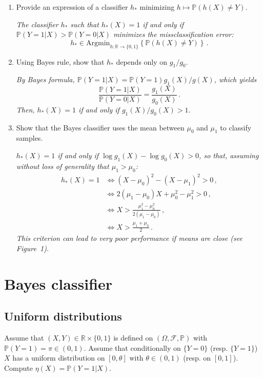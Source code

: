 \documentclass[a4paper,10pt,fleqn]{article}
\newcommand{\eqsp}{\,}
\newcommand{\rset}{\ensuremath{\mathbb{R}}}
\newcommand{\bP}{\mathbb{P}}
\newcommand{\1}{\ensuremath{\mathbbm{1}}}
\begin{document}
\begin{enumerate}
\item Provide an expression of a classifier $h_*$ minimizing $h \mapsto \bP(h(X)\neq Y)$.

\vspace{.2cm}

{\em The classifier $h_*$ such that $h_{*}(X) = 1$ if and only if $\bP(Y=1|X)> \bP(Y=0|X)$ minimizes the missclassification error:
$$
h_{*} \in \mathrm{Argmin}_{h:\rset\to \{0,1\}}\left\{\bP(h(X)\neq Y)\right\}\eqsp.
$$
}

\item Using Bayes rule, show that  $h_*$ depends only on $g_1/g_0$.

\vspace{.2cm}

{\em  By Bayes formula, $\bP(Y=1|X) = \bP(Y=1)g_1(X)/g(X)$, which yields
$$
\frac{\bP(Y=1|X)}{\bP(Y=0|X)} = \frac{g_1(X)}{g_0(X)}\eqsp.
$$
Then, $h_*(X) = 1$ if and only if $g_1(X)/g_0(X)>1$.
}

\item Show that the Bayes classifier uses the mean between  $\mu_0$ and  $\mu_1$ to classify samples.

\vspace{.2cm}

{\em $h_*(X) = 1$ if and only if  $\log g_1(X) - \log g_0(X)>0$, so that, assuming without loss of generality that $\mu_1>\mu_0$:
\begin{align*}
h_*(X) = 1 & \Leftrightarrow (X-\mu_0)^2 - (X-\mu_1)^2>0\,,\\
& \Leftrightarrow 2 (\mu_1-\mu_0)X + \mu_0^2 - \mu_1^2>0\,,\\
&\Leftrightarrow X> \frac{\mu_1^2 - \mu_0^2}{2(\mu_1-\mu_0)}\,,\\
& \Leftrightarrow X> \frac{\mu_1 + \mu_0}{2}\eqsp.
\end{align*}
This criterion can lead to very poor performance if means are close (see Figure~1).}
\end{enumerate}



\section{Bayes classifier}
\subsection{Uniform distributions}
Assume that $(X,Y)\in\mathbb{R}\times\{0,1\}$ is defined on $(\Omega,\mathcal{F},\mathbb{P})$ with $\mathbb{P}(Y=1) = \pi \in(0,1)$.  Assume that conditionally on $\{Y=0\}$ (resp. $\{Y=1\}$) $X$ has a uniform distribution on $[0,\theta]$ with $\theta\in(0,1)$ (resp. on $[0,1]$). Compute $\eta(X) = \mathbb{P}(Y=1 |X)$.
\end{document}
